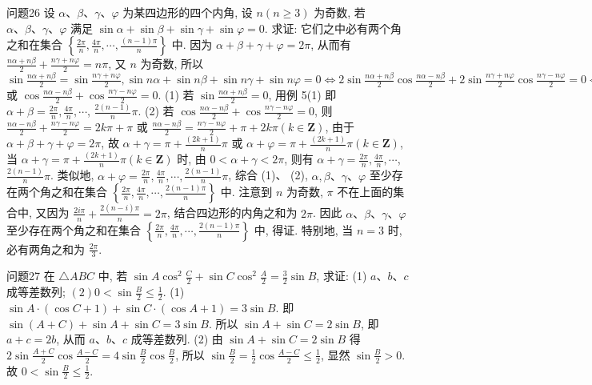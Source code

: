 问题26 设 $\alpha 、 \beta 、 \gamma 、 \varphi$ 为某四边形的四个内角, 设 $n(n \geqslant 3)$ 为奇数, 若 $\alpha 、 \beta 、 \gamma 、 \varphi$ 满足 $\sin \alpha+\sin \beta+\sin \gamma+\sin \varphi=0$. 求证: 它们之中必有两个角之和在集合 $\left\{\frac{2 \pi}{n}, \frac{4 \pi}{n}, \cdots, \frac{(n-1) \pi}{n}\right\}$ 中.
因为 $\alpha+\beta+\gamma+\varphi=2 \pi$, 从而有 $\frac{n \alpha+n \beta}{2}+\frac{n \gamma+n \varphi}{2}=n \pi$, 又 $n$ 为奇数, 所以 $\sin \frac{n \alpha+n \beta}{2}=\sin \frac{n \gamma+n \varphi}{2}, \sin n \alpha+\sin n \beta+\sin n \gamma+\sin n \varphi=0 \Leftrightarrow 2 \sin \frac{n \alpha+n \beta}{2} \cos \frac{n \alpha-n \beta}{2}+2 \sin \frac{n \gamma+n \varphi}{2} \cos \frac{n \gamma-n \varphi}{2}=0 \Leftrightarrow 2 \sin \frac{n \alpha+n \beta}{2} \cos \frac{n \alpha-n \beta}{2}+ 2 \sin \frac{n \alpha+n \beta}{2} \cos \frac{m \gamma-n \varphi}{2}=0 \Leftrightarrow 2 \sin \frac{n \alpha+n \beta}{2}=0$ 或 $\cos \frac{n \alpha-n \beta}{2}+ \cos \frac{n \gamma-n \varphi}{2}=0$. (1) 若 $\sin \frac{n \alpha+n \beta}{2}=0$, 用例 5(1) 即 $\alpha+\beta=\frac{2 \pi}{n}, \frac{4 \pi}{n}, \cdots$, $\frac{2(n-1)}{n} \pi$. (2) 若 $\cos \frac{n \alpha-n \beta}{2}+\cos \frac{n \gamma-n \varphi}{2}=0$, 则 $\frac{n \alpha-n \beta}{2}+\frac{n \gamma-n \varphi}{2}= 2 k \pi+\pi$ 或 $\frac{n \alpha-n \beta}{2}=\frac{n \gamma-n \varphi}{2}+\pi+2 k \pi(k \in \mathbf{Z})$, 由于 $\alpha+\beta+\gamma+\varphi=2 \pi$, 故 $\alpha+\gamma=\pi+\frac{(2 k+1)}{n} \pi$ 或 $\alpha+\varphi=\pi+\frac{(2 k+1)}{n} \pi(k \in \mathbf{Z})$, 当 $\alpha+\gamma=\pi+ \frac{(2 k+1)}{n} \pi(k \in \mathbf{Z})$ 时, 由 $0<\alpha+\gamma<2 \pi$, 则有 $\alpha+\gamma=\frac{2 \pi}{n}, \frac{4 \pi}{n}, \cdots$, $\frac{2(n-1)}{n} \pi$. 类似地, $\alpha+\varphi=\frac{2 \pi}{n}, \frac{4 \pi}{n}, \cdots, \frac{2(n-1)}{n} \pi$, 综合 (1)、 (2), $\alpha, \beta 、 \gamma 、 \varphi$ 至少存在两个角之和在集合 $\left\{\frac{2 \pi}{n}, \frac{4 \pi}{n}, \cdots, \frac{2(n-1) \pi}{n}\right\}$ 中.
注意到 $n$ 为奇数, $\pi$ 不在上面的集合中, 又因为 $\frac{2 i \pi}{n}+\frac{2(n-i) \pi}{n}=2 \pi$, 结合四边形的内角之和为 $2 \pi$. 因此 $\alpha 、 \beta 、 \gamma 、 \varphi$ 至少存在两个角之和在集合 $\left\{\frac{2 \pi}{n}, \frac{4 \pi}{n}, \cdots, \frac{2(n-1) \pi}{n}\right\}$ 中, 得证.
特别地, 当 $n=3$ 时,必有两角之和为 $\frac{2 \pi}{3}$.



问题27 在 $\triangle A B C$ 中, 若 $\sin A \cos ^2 \frac{C}{2}+\sin C \cos ^2 \frac{A}{2}=\frac{3}{2} \sin B$, 求证: (1) $a 、 b 、 c$ 成等差数列; $(2) 0<\sin \frac{B}{2} \leqslant \frac{1}{2}$.
(1) $\sin A \cdot(\cos C+1)+\sin C \cdot(\cos A+1)=3 \sin B$. 即 $\sin (A+ C)+\sin A+\sin C=3 \sin B$. 所以 $\sin A+\sin C=2 \sin B$, 即 $a+c=2 b$, 从而 $a 、 b 、 c$ 成等差数列.
(2) 由 $\sin A+\sin C=2 \sin B$ 得 $2 \sin \frac{A+C}{2} \cos \frac{A-C}{2}= 4 \sin \frac{B}{2} \cos \frac{B}{2}$, 所以 $\sin \frac{B}{2}=\frac{1}{2} \cos \frac{A-C}{2} \leqslant \frac{1}{2}$, 显然 $\sin \frac{B}{2}>0$. 故 $0< \sin \frac{B}{2} \leqslant \frac{1}{2}$.



